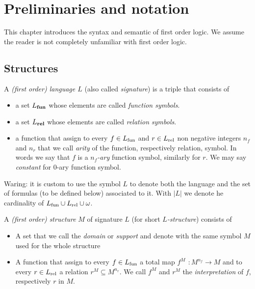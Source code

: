 \chapter{Preliminaries and notation}\label{termini}
This chapter introduces the syntax and semantic of first order logic. We assume the reader is not completely unfamiliar with  first order logic. 


\section{Structures}

A \emph{(first order) language $L$\/}  (also called \emph{signature\/}) is a triple that consists of

\begin{itemize}
\item a set \emph{$L_{\rm\bf fun}$} whose elements are called \emph{function symbols}.
\item a set \emph{$L_{\rm\bf rel}$\/} whose elements are called \emph{relation symbols}.
\item a function that assign to every $f\in L_{\rm fun}$ and $r\in L_{\rm rel}$ non negative integers $n_f$ and $n_r$ that we call \emph{arity\/} of the function, respectively relation, symbol. In words we say that $f$ is a \emph{$n_f$-ary} function symbol, similarly for $r$. We may say \emph{constant\/} for $0$-ary function symbol.
\end{itemize}

Waring: it is custom to use the symbol \emph{$L$} to denote both the language and the set of formulas (to be defined below) associated to it. With \emph{$|L|$} we denote he cardinality of $L_{\rm fun}\cup L_{\rm rel}\cup\omega$.


A \emph{(first order) structure\/} $M$ of signature $L$ (for short \emph{$L$-structure}) consists of

\begin{itemize}
\item A set that we call the \emph{domain\/} or \emph{support} and denote with the same symbol $M$ used for the whole structure
\item A function that assign to every $f\in L_{\rm fun}$ a total map \emph{$f^M$ $: M^{n_f}\to M$} and to every  $r\in L_{\rm rel}$ a relation \emph{$r^M\subseteq M^{n_r}$}. We call $f^M$ and $r^M$ the \emph{interpretation\/} of $f$, respectively $r$ in $M$.
\end{itemize}


